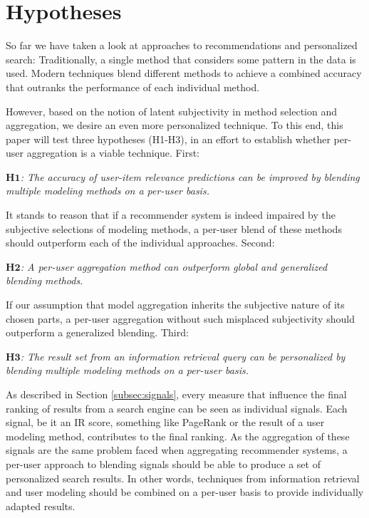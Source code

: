 \section{Hypotheses}

So far we have taken a look at approaches to recommendations and personalized search:
Traditionally, a single method that considers some pattern in the data is used.
Modern techniques blend different methods to achieve a combined accuracy 
that outranks the performance of each individual method.

However, based on the notion of latent subjectivity in method selection and aggregation,
we desire an even more personalized technique. 
To this end, this paper will test three hypotheses (H1-H3), in an effort to establish
whether per-user aggregation is a viable technique. First:

{
  \itshape
  $\mathbf{H1}$: The accuracy of user-item relevance predictions can be improved
  by blending multiple modeling methods on a per-user basis.
}

It stands to reason that if a recommender system is indeed impaired
by the subjective selections of modeling methods,
a per-user blend of these methods should outperform each of the individual approaches.
Second:

{
  \itshape
  $\mathbf{H2}$: A per-user aggregation method can outperform global and generalized 
  blending methods.
}

If our assumption that model aggregation inherits the subjective nature of its chosen parts,
a per-user aggregation without such misplaced subjectivity should outperform a
generalized blending.
Third:

{
  \itshape
  $\mathbf{H3}$: The result set from an information retrieval query
  can be personalized by blending multiple modeling methods on a per-user basis.
}

As described in Section \ref{subsec:signals},
every measure that influence the final ranking of results from a search engine
can be seen as individual signals. Each signal, be it an IR score,
something like PageRank or the result of a user modeling method,
contributes to the final ranking.
As the aggregation of these signals are the same problem faced
when aggregating recommender systems,
a per-user approach to blending signals should be able to
produce a set of personalized search results.
In other words, techniques from information retrieval and user modeling
should be combined on a per-user basis to provide individually adapted results.

